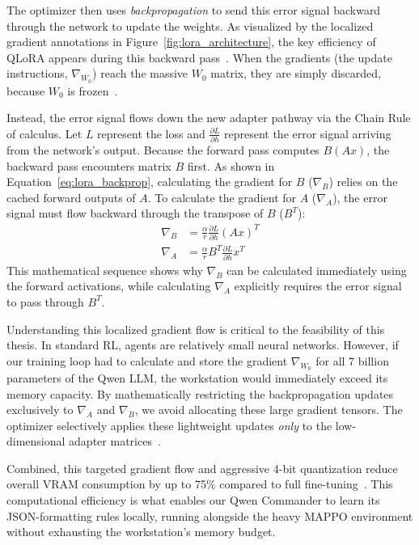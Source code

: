 The optimizer then uses \emph{backpropagation} to send this error signal backward through the network to update the weights. As visualized by the localized gradient annotations in Figure~\ref{fig:lora_architecture}, the key efficiency of QLoRA appears during this backward pass~\parencite{Dettmers_Pagnoni_Holtzman_Zettlemoyer_2023}. When the gradients (the update instructions, $\nabla_{W_0}$) reach the massive $W_0$ matrix, they are simply discarded, because $W_0$ is frozen~\parencite{Dettmers_Pagnoni_Holtzman_Zettlemoyer_2023}. 

Instead, the error signal flows down the new adapter pathway via the Chain Rule of calculus. Let $L$ represent the loss and $\frac{\partial L}{\partial h}$ represent the error signal arriving from the network's output. Because the forward pass computes $B(Ax)$, the backward pass encounters matrix $B$ first. As shown in Equation~\ref{eq:lora_backprop}, calculating the gradient for $B$ ($\nabla_B$) relies on the cached forward outputs of $A$. To calculate the gradient for $A$ ($\nabla_A$), the error signal must flow backward through the transpose of $B$ ($B^T$):
\begin{align}
\label{eq:lora_backprop}
    \nabla_B &= \frac{\alpha}{r} \frac{\partial L}{\partial h} (Ax)^T \nonumber \\
    \nabla_A &= \frac{\alpha}{r} B^T \frac{\partial L}{\partial h} x^T
\end{align}
This mathematical sequence shows why $\nabla_B$ can be calculated immediately using the forward activations, while calculating $\nabla_A$ explicitly requires the error signal to pass through $B^T$. 

Understanding this localized gradient flow is critical to the feasibility of this thesis. In standard RL, agents are relatively small neural networks. However, if our training loop had to calculate and store the gradient $\nabla_{W_0}$ for all 7 billion parameters of the Qwen LLM, the workstation would immediately exceed its memory capacity. By mathematically restricting the backpropagation updates exclusively to $\nabla_A$ and $\nabla_B$, we avoid allocating these large gradient tensors. The optimizer selectively applies these lightweight updates \emph{only} to the low-dimensional adapter matrices~\parencite{Dettmers_Pagnoni_Holtzman_Zettlemoyer_2023}. 

Combined, this targeted gradient flow and aggressive 4-bit quantization reduce overall VRAM consumption by up to 75\% compared to full fine-tuning~\parencite{Dettmers_Pagnoni_Holtzman_Zettlemoyer_2023}. This computational efficiency is what enables our Qwen Commander to learn its JSON-formatting rules locally, running alongside the heavy MAPPO environment without exhausting the workstation's memory budget.

